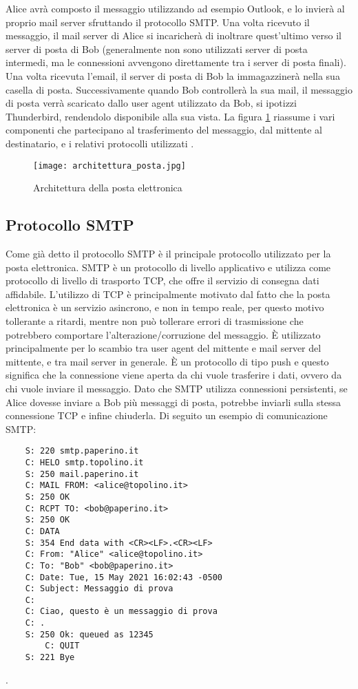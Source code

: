 Alice avrà composto il messaggio utilizzando ad esempio Outlook, e lo invierà al proprio mail server 
sfruttando il protocollo SMTP. Una volta ricevuto il messaggio, il mail server di Alice si incaricherà di 
inoltrare quest'ultimo verso il server di posta di Bob (generalmente non sono utilizzati server di posta intermedi, 
ma le connessioni avvengono direttamente tra i server di posta finali). 
Una volta ricevuta l'email, il server di posta di Bob la immagazzinerà nella sua casella di posta. 
Successivamente quando Bob controllerà la sua mail, il messaggio di posta verrà scaricato dallo user agent 
utilizzato da Bob, si ipotizzi Thunderbird, rendendolo disponibile alla sua vista.
La figura \ref{architetturaPosta} riassume i vari componenti che partecipano al trasferimento del messaggio, dal
mittente al destinatario, e i relativi protocolli utilizzati \cite{kurose2008reti}.

\begin{figure}[htp]
    \centering
    \texttt{[image: architettura\_posta.jpg]}
        \caption{Architettura della posta elettronica}\label{architetturaPosta}
  \end{figure}


\subsection{Protocollo SMTP}
Come già detto il protocollo SMTP è il principale protocollo utilizzato per la posta elettronica.
SMTP è un protocollo di livello applicativo e utilizza come protocollo di livello di trasporto TCP,
che offre il servizio di consegna dati affidabile. 
L'utilizzo di TCP è principalmente motivato dal fatto che la posta elettronica è un servizio asincrono, 
e non in tempo reale, per questo motivo tollerante a ritardi, mentre non può tollerare errori di trasmissione 
che potrebbero comportare l'alterazione/corruzione del messaggio. 
È utilizzato principalmente per lo scambio tra user agent del mittente e mail server del mittente, e tra mail server 
in generale. È un protocollo di tipo push e questo significa che la connessione viene aperta da chi vuole 
trasferire i dati, ovvero da chi vuole inviare il messaggio. Dato che SMTP utilizza connessioni persistenti, 
se Alice dovesse inviare a Bob più messaggi di posta, potrebbe inviarli sulla stessa connessione TCP e 
infine chiuderla.
Di seguito un esempio di comunicazione SMTP:
\pagebreak
\begin{verbatim}
    S: 220 smtp.paperino.it
    C: HELO smtp.topolino.it
    S: 250 mail.paperino.it
    C: MAIL FROM: <alice@topolino.it>
    S: 250 OK
    C: RCPT TO: <bob@paperino.it>
    S: 250 OK
    C: DATA
    S: 354 End data with <CR><LF>.<CR><LF>
    C: From: "Alice" <alice@topolino.it>
    C: To: "Bob" <bob@paperino.it>
    C: Date: Tue, 15 May 2021 16:02:43 -0500
    C: Subject: Messaggio di prova
    C: 
    C: Ciao, questo è un messaggio di prova
    C: .
    S: 250 Ok: queued as 12345
        C: QUIT
    S: 221 Bye
\end{verbatim}\cite{SMTP}.

